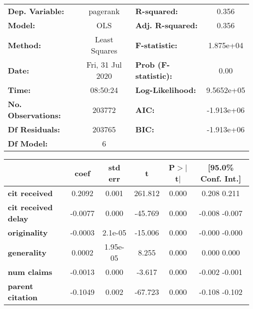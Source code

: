 \begin{center}
\begin{tabular}{lclc}
\toprule
\textbf{Dep. Variable:}     &     pagerank     & \textbf{  R-squared:         } &        0.356     \\
\textbf{Model:}             &       OLS        & \textbf{  Adj. R-squared:    } &        0.356     \\
\textbf{Method:}            &  Least Squares   & \textbf{  F-statistic:       } &    1.875e+04     \\
\textbf{Date:}              & Fri, 31 Jul 2020 & \textbf{  Prob (F-statistic):} &        0.00      \\
\textbf{Time:}              &     08:50:24     & \textbf{  Log-Likelihood:    } &    9.5652e+05    \\
\textbf{No. Observations:}  &      203772      & \textbf{  AIC:               } &    -1.913e+06    \\
\textbf{Df Residuals:}      &      203765      & \textbf{  BIC:               } &    -1.913e+06    \\
\textbf{Df Model:}          &           6      & \textbf{                     } &                  \\
\bottomrule
\end{tabular}
\begin{tabular}{lccccc}
                            & \textbf{coef} & \textbf{std err} & \textbf{t} & \textbf{P$>$$|$t$|$} & \textbf{[95.0\% Conf. Int.]}  \\
\midrule
\textbf{cit received}       &       0.2092  &        0.001     &   261.812  &         0.000        &         0.208     0.211       \\
\textbf{cit received delay} &      -0.0077  &        0.000     &   -45.769  &         0.000        &        -0.008    -0.007       \\
\textbf{originality}        &      -0.0003  &      2.1e-05     &   -15.006  &         0.000        &        -0.000    -0.000       \\
\textbf{generality}         &       0.0002  &     1.95e-05     &     8.255  &         0.000        &         0.000     0.000       \\
\textbf{num claims}         &      -0.0013  &        0.000     &    -3.617  &         0.000        &        -0.002    -0.001       \\
\textbf{parent citation}    &      -0.1049  &        0.002     &   -67.723  &         0.000        &        -0.108    -0.102       \\

\end{tabular}
\end{center}
